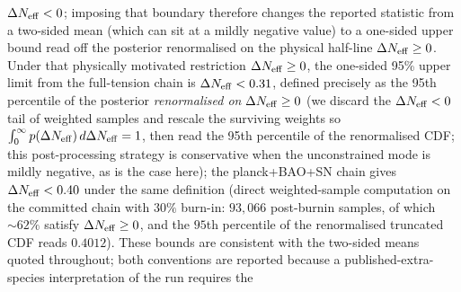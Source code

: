 \documentclass[aps,prd,twocolumn,superscriptaddress,showpacs,preprintnumbers,nofootinbib,longbibliography,floatfix]{revtex4-2}
\newcommand{\Neff}{N_{\rm eff}}
\begin{document}
$\Delta\Neff < 0$; imposing that boundary therefore changes the reported
statistic from a two-sided mean (which can sit at a mildly negative value)
to a one-sided upper bound read off the posterior renormalised on the
physical half-line $\Delta\Neff\ge 0$. Under that physically motivated
restriction $\Delta\Neff\ge 0$, the
one-sided 95\% upper limit from the full-tension chain is
$\Delta\Neff < 0.31$, defined precisely as the 95th percentile of the
posterior \emph{renormalised on $\Delta\Neff \ge 0$} (we discard the
$\Delta\Neff < 0$ tail of weighted samples and rescale the surviving
weights so $\int_0^\infty p(\Delta\Neff)\,d\Delta\Neff = 1$, then read
the 95th percentile of the renormalised CDF; this post-processing strategy
is conservative when the unconstrained mode is mildly negative, as is the
case here); the planck+BAO+SN chain
gives $\Delta\Neff < 0.40$ under the same definition (direct
weighted-sample computation on the committed chain with $30\%$ burn-in:
$93{,}066$ post-burnin samples, of which $\sim 62\%$ satisfy
$\Delta\Neff\ge 0$, and the $95$th percentile of the renormalised
truncated CDF reads $0.4012$).  These bounds are consistent with the two-sided
means quoted throughout; both conventions are reported because a
published-extra-species interpretation of the run requires the
\end{document}
